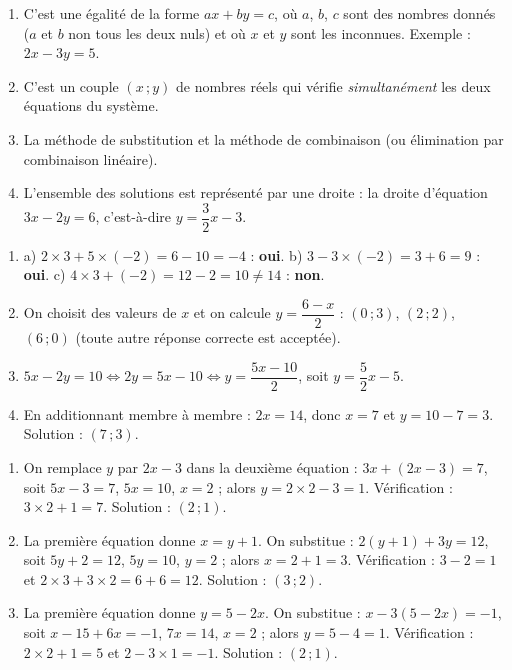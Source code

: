 \documentclass[11pt]{article}
\newcommand{\cle}[1]{{\popxbold\color{popdark}#1}}
\begin{document}
\begin{corrige}
\begin{enumerate}
\item C'est une égalité de la forme $ax+by=c$, où $a$, $b$, $c$ sont des nombres donnés ($a$ et $b$ non tous les deux nuls) et où $x$ et $y$ sont les inconnues. Exemple : $2x-3y=5$.
\item C'est un couple $(x\,;y)$ de nombres réels qui vérifie \emph{simultanément} les deux équations du système.
\item La méthode de \cle{substitution} et la méthode de \cle{combinaison} (ou élimination par combinaison linéaire).
\item L'ensemble des solutions est représenté par une \cle{droite} : la droite d'équation $3x-2y=6$, c'est-à-dire $y=\dfrac{3}{2}x-3$.
\end{enumerate}
\end{corrige}

\begin{corrige}
\begin{enumerate}
\item a) $2\times 3 + 5\times(-2) = 6-10 = -4$ : \textbf{oui}. \quad b) $3 - 3\times(-2) = 3+6 = 9$ : \textbf{oui}. \quad c) $4\times 3 + (-2) = 12-2=10 \neq 14$ : \textbf{non}.
\item On choisit des valeurs de $x$ et on calcule $y=\dfrac{6-x}{2}$ : $(0\,;3)$, $(2\,;2)$, $(6\,;0)$ (toute autre réponse correcte est acceptée).
\item $5x-2y=10 \iff 2y = 5x-10 \iff y=\dfrac{5x-10}{2}$, soit $y=\dfrac{5}{2}x-5$.
\item En additionnant membre à membre : $2x=14$, donc $x=7$ et $y=10-7=3$. Solution : $(7\,;3)$.
\end{enumerate}
\end{corrige}

\begin{corrige}
\begin{enumerate}
\item On remplace $y$ par $2x-3$ dans la deuxième équation : $3x+(2x-3)=7$, soit $5x-3=7$, $5x=10$, $x=2$ ; alors $y=2\times 2-3=1$. Vérification : $3\times 2+1=7$. Solution : $(2\,;1)$.
\item La première équation donne $x=y+1$. On substitue : $2(y+1)+3y=12$, soit $5y+2=12$, $5y=10$, $y=2$ ; alors $x=2+1=3$. Vérification : $3-2=1$ et $2\times 3+3\times 2=6+6=12$. Solution : $(3\,;2)$.
\item La première équation donne $y=5-2x$. On substitue : $x-3(5-2x)=-1$, soit $x-15+6x=-1$, $7x=14$, $x=2$ ; alors $y=5-4=1$. Vérification : $2\times 2+1=5$ et $2-3\times 1=-1$. Solution : $(2\,;1)$.
\end{enumerate}
\end{corrige}
\end{document}
